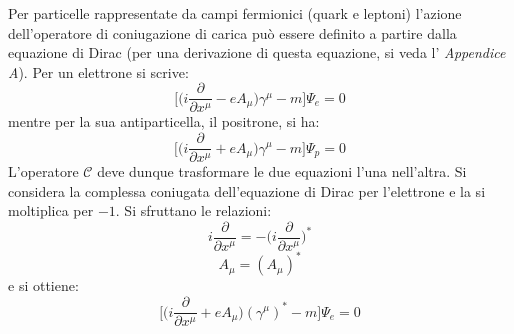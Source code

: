 Per particelle rappresentate da campi fermionici (quark e leptoni) l'azione dell'operatore di coniugazione di carica può essere definito a partire dalla equazione di 
Dirac (per una derivazione di questa equazione, si veda l' \emph{Appendice A}). Per un elettrone si scrive:
\begin{equation}
 \Big[\Big(i\frac{\partial}{\partial x^\mu}-eA_\mu\Big) \gamma^\mu - m\Big] \Psi_e = 0
\end{equation}
mentre per la sua antiparticella, il positrone, si ha:
\begin{equation}
 \Big[\Big(i\frac{\partial}{\partial x^\mu}+eA_\mu\Big) \gamma^\mu - m\Big] \Psi_p = 0
\end{equation}
L'operatore $\mathscr{C}$ deve dunque trasformare le due equazioni l'una nell'altra.
Si considera la complessa coniugata dell'equazione di Dirac per l'elettrone e la si moltiplica per $-1$.
Si sfruttano le relazioni:
\begin{equation}
 i\frac{\partial}{\partial x^\mu} = -\Big(i\frac{\partial}{\partial x^\mu}\Big)^*
\end{equation}
\begin{equation}
A_\mu = (A_\mu)^*  
\end{equation}
e si ottiene:
\begin{equation}
 \Big[\Big(i\frac{\partial}{\partial x^\mu}+eA_\mu\Big) (\gamma^\mu)^* - m\Big] \Psi_e = 0
\end{equation}

